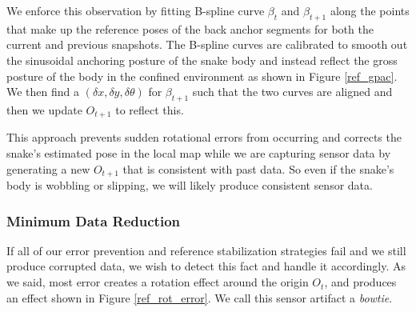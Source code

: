 We enforce this observation by fitting B-spline curve $\beta_t$ and $\beta_{t+1}$ along the points that make up the reference poses of the back anchor segments for both the current and previous snapshots.  The B-spline curves are calibrated to smooth out the sinusoidal anchoring posture of the snake body and instead reflect the gross posture of the body in the confined environment as shown in Figure \ref{ref_gpac}.   We then find a $(\delta x, \delta y, \delta \theta)$ for $\beta_{t+1}$ such that the two curves are aligned and then we update $O_{t+1}$ to reflect this.

This approach prevents sudden rotational errors from occurring and corrects the snake's estimated pose in the local map while we are capturing sensor data by generating a new $O_{t+1}$ that is consistent with past data.  So even if the snake's body is wobbling or slipping, we will likely produce consistent sensor data.
 




\subsubsection{Minimum Data Reduction}

If all of our error prevention and reference stabilization strategies fail and we still produce corrupted data, we wish to detect this fact and handle it accordingly.  As we said, most error creates a rotation effect around the origin $O_t$, and produces an effect shown in Figure \ref{ref_rot_error}.  We call this sensor artifact a \emph{bowtie}.

